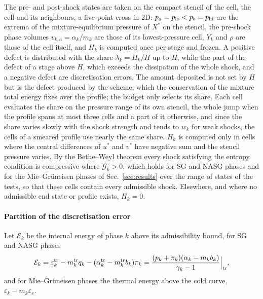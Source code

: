 The pre- and post-shock states are taken on the compact stencil of the cell, the cell and its neighbours, a five-point cross in 2D:
$p_a=p_{\rm lo}<p_b=p_{\rm hi}$ are the extrema of the mixture-equilibrium pressure of $X^*$ on the stencil, the pre-shock phase
volumes $v_{k,a}=\alpha_k/m_k$ are those of its lowest-pressure cell, $Y_k$ and $\rho$ are those of the cell itself, and $H_k$ is
computed once per stage and frozen. A positive defect is distributed with the share $\lambda_k=H_k/H$ up to $H$, while the part
of the defect of a stage above $H$, which exceeds the dissipation of the whole shock, and a negative defect are
discretisation errors. The amount deposited is not set by $H$ but is the defect produced by the scheme, which the
conservation of the mixture total energy fixes over the profile; the budget only selects its share. Each cell evaluates
the share on the pressure range of its own stencil, the whole jump when the profile spans at most three cells and a part
of it otherwise, and since the share varies slowly with the shock strength and tends to $w_k$ for weak shocks, the cells of
a smeared profile use nearly the same share. $H_k$ is computed only in cells where the central differences of $u^*$ and
$v^*$ have negative sum and the stencil pressure varies. By the Bethe--Weyl theorem \cite{MenikoffPlohr1989} every shock satisfying the
entropy condition is compressive where $\mathcal G_k>0$, which holds for SG and NASG phases and for the Mie--Gr\"uneisen phases
of Sec.~\ref{sec:results} over the range of states of the tests, so that these cells contain every admissible shock. Elsewhere,
and where no admissible end state or profile exists, $H_k=0$.

\paragraph{Partition of the discretisation error}
Let $\mathcal E_k$ be the internal energy of phase $k$ above its admissibility
bound, for SG and NASG phases
\begin{equation}
\mathcal E_k=\varepsilon^{\rm tr}_k-m^{\rm tr}_kq_k-(\alpha^{\rm tr}_k-m^{\rm tr}_kb_k)\pi_k=\frac{(p_k+\pi_k)(\alpha_k-m_kb_k)}{\gamma_k-1}\Big|_{\rm tr},
\label{eq:Ek}
\end{equation}
and for Mie--Gr\"uneisen phases the thermal energy above the cold curve, $\varepsilon_k-m_k\varepsilon_r$.

